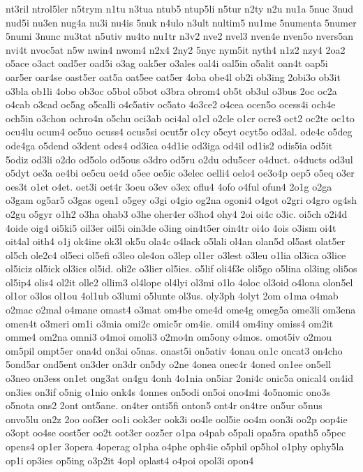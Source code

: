 {nt3ril
ntrol5ler
n5trym
n1tu
n3tua
ntub5
ntup5li
n5tur
n2ty
n2u
nu1a
5nuc
3nud
nud5i
nu3en
nug4a
nu3i
nu4is
5nuk
n4ulo
n3ult
nultim5
nu1me
5numenta
5numer
5numi
3nunc
nu3tat
n5utiv
nu4to
nu1tr
n3v2
nve2
nvel3
nven4e
nven5o
nvers5an
nvi4t
nvoc5at
n5w
nwin4
nwom4
n2x4
2ny2
5nyc
nym5it
nyth4
n1z2
nzy4
2oa2
o5ace
o3act
oad5er
oad5i
o3ag
oak5er
o3ales
oal4i
oal5in
o5alit
oan4t
oap5i
oar5er
oar4se
oast5er
oat5a
oat5ee
oat5er
4oba
obe4l
ob2i
ob3ing
2obi3o
ob3it
o3bla
ob1li
4obo
ob3oc
o5bol
o5bot
o3bra
obrom4
ob5t
ob3ul
o3bus
2oc
oc2a
o4cab
o3cad
oc5ag
o5calli
o4c5ativ
oc5ato
4o3ce2
o4cea
ocen5o
ocess4i
och4e
och5in
o3chon
ochro4n
o5chu
oci3ab
oci4al
o1cl
o2cle
o1cr
ocre3
oct2
oc2te
oc1to
ocu4lu
ocum4
oc5uo
ocuss4
ocus5si
ocut5r
o1cy
o5cyt
ocyt5o
od3al.
ode4c
o5deg
ode4ga
o5dend
o3dent
odes4
od3ica
o4d1ie
od3iga
od4il
od1is2
odis5ia
od5it
5odiz
od3li
o2do
od5olo
od5ous
o3dro
od5ru
o2du
odu5cer
o4duct.
o4ducts
od3ul
o5dyt
oe3a
oe4bi
oe5cu
oe4d
o5ee
oe5ic
o3elec
oelli4
oelo4
oe3o4p
oep5
o5eq
o3er
oes3t
o1et
o4et.
oet3i
oet4r
3oeu
o3ev
o3ex
oflu4
4ofo
o4ful
ofun4
2o1g
o2ga
o3gam
og5ar5
o3gas
ogen1
o5gey
o3gi
o4gio
og2na
ogoni4
o4got
o2gri
o4gro
og4sh
o2gu
o5gyr
o1h2
o3ha
ohab3
o3he
oher4er
o3ho4
ohy4
2oi
oi4c
o3ic.
oi5ch
o2i4d
4oide
oig4
oi5ki5
oil3er
oil5i
oin3de
o3ing
oin4t5er
oin4tr
oi4o
4ois
o3ism
oi4t
oit4al
oith4
o1j
ok4ine
ok3l
ok5u
ola4c
o4lack
o5lali
ol4an
olan5d
ol5ast
olat5er
ol5ch
ole2c4
ol5eci
ol5efi
o3leo
ole4on
o3lep
ol1er
o3lest
o3leu
o1lia
ol3ica
o3lice
ol5iciz
ol5ick
ol3ics
ol5id.
oli2e
o3lier
ol5ies.
o5lif
oli4f3e
oli5go
o5lina
ol3ing
oli5os
ol5ip4
olis4
ol2it
olle2
ollim3
ol4lope
ol4lyi
ol3mi
o1lo
4oloc
ol3oid
o4lona
olon5el
ol1or
o3los
ol1ou
4ol1ub
o3lumi
o5lunte
ol3us.
oly3ph
4olyt
2om
o1ma
o4mab
o2mac
o2mal
o4mane
omast4
o3mat
om4be
ome4d
ome4g
omeg5a
ome3li
om3ena
omen4t
o3meri
om1i
o3mia
omi2c
omic5r
om4ie.
omil4
om4iny
omiss4
om2it
omme4
om2na
omni3
o4moi
omoli3
o2mo4n
om5ony
o4mos.
omot5iv
o2mou
om5pil
ompt5er
ona4d
on3ai
o5nas.
onast5i
on5ativ
4onau
on1c
oncat3
on4cho
5ond5ar
ond5ent
on3der
on3dr
on5dy
o2ne
4onea
onec4r
4oned
on1ee
on5ell
o3neo
on3ess
on1et
ong3at
on4gu
4onh
4o1nia
on5iar
2oni4c
onic5a
onical4
on4id
on3ies
on3if
o5nig
o1nio
onk4s
4onnes
on5odi
on5oi
ono4mi
4o5nomic
ono3s
o5nota
ons2
2ont
ont5ane.
on4ter
onti5fi
onton5
ont4r
on4tre
on5ur
o5nus
onvo5lu
on2z
2oo
oof3er
oo1i
ook3er
ook3i
oo4le
ool5ie
oo4m
oon3i
oo2p
oop4ie
o3opt
oo4se
oost5er
oo2t
oot3er
ooz5er
o1pa
o4pab
o5pali
opa5ra
opath5
o5pec
opens4
op1er
3opera
4operag
o1pha
o4phe
oph4ie
o5phil
op5hol
o1phy
ophy5la
op1i
op3ies
op5ing
o3p2it
4opl
oplast4
o4poi
opol3i
opon4
}
